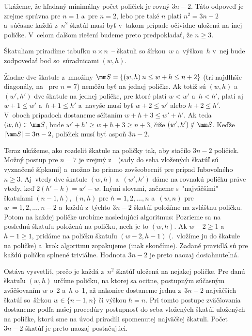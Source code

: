 {%
Ukážeme, že hľadaný minimálny počet poličiek je rovný $3n-2$. Táto
odpoveď je zrejme správna pre $n=1$ a~pre $n=2$, lebo pre také
$n$ platí $n^2=3n-2$ a~súčasne každá z~$n^2$ škatúľ musí byť
v~takom prípade očividne uložená na inej poličke. V~celom ďalšom riešení budeme preto
predpokladať, že $n\ge3$.

Škatuliam priradíme tabuľku $n \times n$~-- škatuli so šírkou~$w$
a~výškou~$h$ v~nej bude zodpovedať bod so~súradnicami $(w, h)$.

Žiadne dve škatule z~množiny $\mm S= \{(w, h)\: n \le w+h \le n+2\}$ (tri
najdlhšie diagonály, na \obr\ pre $n=7$) nemôžu byť na jednej poličke.
Ak totiž sú $(w, h)$ a~$(w', h')$ dve škatule na jednej poličke, pre
ktoré platí $w<w'$ a~$h<h'$, platí aj~$w+1 \le w'$ a~${h+1} \le h'$
a~navyše musí byť $w+2 \le w'$ alebo $h+2 \le h'$. V~oboch prípadoch
dostaneme sčítaním $w+h+3 \le w'+ h'$. Ak teda $(w, h) \in\mm S$, bude
$w'+ h' \ge {w+h+3} \ge n+3$, čiže $(w', h') \notin\mm S$.
Keďže $|\mm S| = 3n-2$, poličiek musí byť aspoň $3n-2$.
%

Teraz ukážeme, ako rozdeliť škatule na poličky tak, aby stačilo $3n-2$
poličiek. Možný postup pre $n=7$ je zrejmý z~\obr\ (sady do seba vložených
škatúľ sú vyznačené šípkami) a~možno ho priamo zovšeobecniť pre prípad ľubovoľného
$n\ge3$. Aj~vtedy dve škatule $(w, h)$ a~$(w', h')$ dáme na rovnakú poličku práve
vtedy, keď $2 (h'-h) = w'-w$.
Inými slovami, začneme s~"najväčšími" škatuľami $(n-1, h)$, $(n, h)$ pre
$h= 1,2, \dots, n$ a~$(w, n)$ pre $w~= 1, 2, \dots, n-2$ a~každú z~týchto
$3n-2$ škatúľ položíme na zvláštnu poličku. Potom na každej poličke urobíme
nasledujúci algoritmus: Pozrieme sa na poslednú škatuľu položenú na
poličku, nech je to $(w, h)$. Ak $w-2 \ge 1$ a~$h-1 \ge 1$, pridáme na
poličku škatuľu $(w-2, h-1)$ (\tj.~vložíme ju do škatule na
poličke) a~krok algoritmu zopakujeme (inak skončíme). Zadané pravidlá sú pre každú
poličku splnené triviálne. Hodnota $3n-2$ je preto naozaj dosiahnuteľná.

Ostáva vysvetliť, prečo je každá z~$n^2$ škatúľ uložená na nejakej
poličke. Pre danú škatuľu $(w,h)$ určíme poličku, na ktorej sa ocitne,
postupným súčasným zväčšovaním $w$ o~2 a~$h$ o~1, až nakoniec dostaneme
jednu z~$3n-2$ najväčších škatúľ so~šírkou $w\in\{n-1,n\}$ či výškou
$h=n$. Pri tomto postupe zväčšovania dostaneme podľa našej
procedúry postupnosť do seba vložených škatúľ uložených na poličke,
ktorú sme na úvod priradili spomenutej najväčšej škatuli.
Počet $3n-2$ škatúľ je preto naozaj postačujúci.

}
